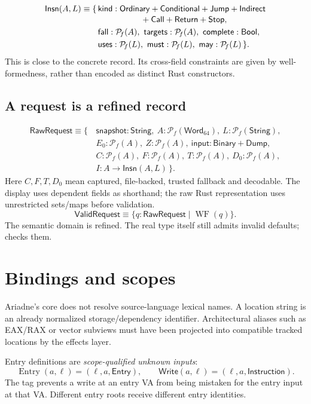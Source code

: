 \documentclass[11pt,a4paper]{article}
\newcommand{\ty}[1]{\mathsf{#1}}
\newcommand{\rec}[1]{\{\,#1\,\}}
\newcommand{\fin}{\mathcal{P}_{\!f}}
\newcommand{\ent}{\operatorname{Entry}}
\newcommand{\wf}{\operatorname{WF}}
\newcommand{\code}[1]{\texttt{\detokenize{#1}}}
\begin{document}
\[
\begin{aligned}
 \ty{Insn}(A,L)\equiv\rec{
  &\ty{kind}:\ty{Ordinary}+\ty{Conditional}+\ty{Jump}+\ty{Indirect}\\[-2pt]
  &\hspace{18mm}+\ty{Call}+\ty{Return}+\ty{Stop},\\
  &\ty{fall}:\fin(A),\ \ty{targets}:\fin(A),\ \ty{complete}:\ty{Bool},\\
  &\ty{uses}:\fin(L),\ \ty{must}:\fin(L),\ \ty{may}:\fin(L)}.
\end{aligned}
\]
This is close to the concrete record. Its cross-field constraints are given
by well-formedness, rather than encoded as distinct Rust constructors.

\subsection{A request is a refined record}
\[
\begin{aligned}
\ty{RawRequest}\equiv\rec{
 &\ty{snapshot}:\ty{String},\ A:\fin(\ty{Word}_{64}),\ L:\fin(\ty{String}),\\
 &E_0:\fin(A),\ Z:\fin(A),\ \ty{input}:\ty{Binary}+\ty{Dump},\\
 &C:\fin(A),\ F:\fin(A),\ T:\fin(A),\ D_0:\fin(A),\\
 &I:A\to\ty{Insn}(A,L)}.
\end{aligned}
\]
Here $C,F,T,D_0$ mean captured, file-backed, trusted fallback and decodable.
The display uses dependent fields as shorthand; the raw Rust representation
uses unrestricted sets/maps before validation.
\[
 \ty{ValidRequest}\equiv\{q:\ty{RawRequest}\mid\wf(q)\}.
\]
The semantic domain is refined. The real \code{AnalysisRequest} type itself
still admits invalid defaults; \code{Analyzer::new} checks them.

\section{Bindings and scopes}
\label{sec:bindings}
Ariadne's core does not resolve source-language lexical names. A location
string is an already normalized storage/dependency identifier. Architectural
aliases such as EAX/RAX or vector subviews must have been projected into
compatible tracked locations by the effects layer.

Entry definitions are \emph{scope-qualified unknown inputs}:
\[
 \ent(a,\ell)=(\ell,a,\ty{Entry}),\qquad
 \ty{Write}(a,\ell)=(\ell,a,\ty{Instruction}).
\]
The tag prevents a write at an entry VA from being mistaken for the entry
input at that VA. Different entry roots receive different entry identities.
\end{document}

